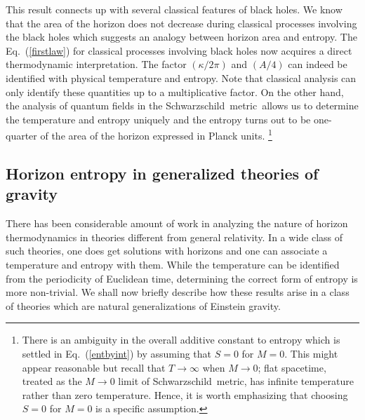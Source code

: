 \documentclass[12pt]{iopart}
\def\eq#1{{Eq.~(\ref{#1})}}
\def\scm{{Schwarzschild\ metric}}
\def\scm{{Schwarzschild\ metric}}
\begin{document}
This result connects up with several classical features of black holes. We know that the area of the horizon does not decrease during classical processes involving the black holes which suggests an analogy between horizon area and  entropy.  The \eq{firstlaw} for classical processes involving black holes  now acquires a direct thermodynamic interpretation. The factor $(\kappa/2\pi)$ and $(A/4)$ can indeed be identified with physical temperature and entropy. Note that classical analysis  can only identify these quantities up to a multiplicative factor.  On the other hand, the analysis of quantum fields in the \scm\ allows us to determine the temperature and entropy uniquely and the entropy turns out to be one-quarter of the area of the horizon expressed in Planck units. \footnote{There is  an ambiguity in the overall additive constant to entropy which is settled in  \eq{entbyint} by assuming that $S=0$ for $M=0$. This might appear reasonable but recall that $T\to\infty$ when $M\to0$; 
flat spacetime, treated as the $M\to 0$ limit of \scm, has infinite temperature rather than zero temperature. 
Hence, it is worth emphasizing that choosing $S=0$ for $M=0$ is a specific assumption.}


 
\subsection{Horizon entropy in generalized theories of gravity}\label{sec:noetherent}

 There has been considerable amount of work in analyzing the nature of horizon thermodynamics in theories different from general relativity. In a wide class of such theories, one does get solutions with horizons and one can associate a temperature and entropy with them. While the temperature can be identified from the periodicity of Euclidean time, determining the correct form of entropy is more non-trivial. We shall now briefly describe how these results arise in a class of theories which are natural generalizations of Einstein gravity. 
\end{document}
